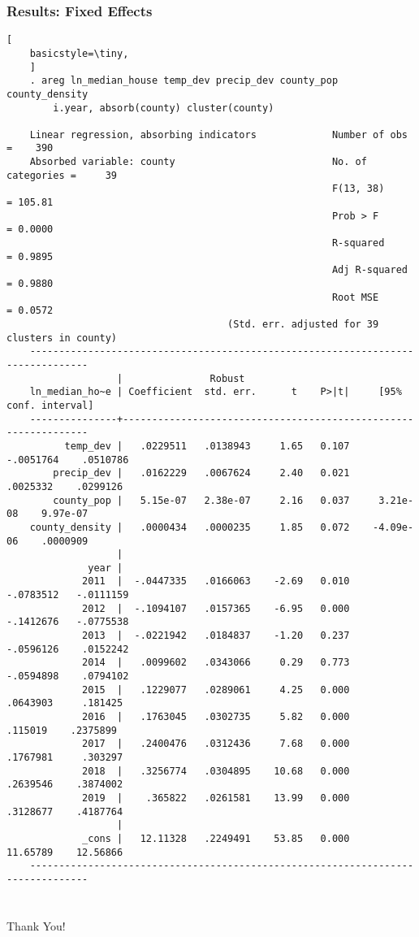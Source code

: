 \documentclass{beamer}
\begin{document}
\begin{frame}[fragile]
    \frametitle{Results: Fixed Effects}
    \begin{lstlisting}[
    basicstyle=\tiny,
    ]
    . areg ln_median_house temp_dev precip_dev county_pop county_density 
        i.year, absorb(county) cluster(county)

    Linear regression, absorbing indicators             Number of obs     =    390
    Absorbed variable: county                           No. of categories =     39
                                                        F(13, 38)         = 105.81
                                                        Prob > F          = 0.0000
                                                        R-squared         = 0.9895
                                                        Adj R-squared     = 0.9880
                                                        Root MSE          = 0.0572
                                      (Std. err. adjusted for 39 clusters in county)
    --------------------------------------------------------------------------------
                   |               Robust
    ln_median_ho~e | Coefficient  std. err.      t    P>|t|     [95% conf. interval]
    ---------------+----------------------------------------------------------------
          temp_dev |   .0229511   .0138943     1.65   0.107    -.0051764    .0510786
        precip_dev |   .0162229   .0067624     2.40   0.021     .0025332    .0299126
        county_pop |   5.15e-07   2.38e-07     2.16   0.037     3.21e-08    9.97e-07
    county_density |   .0000434   .0000235     1.85   0.072    -4.09e-06    .0000909
                   |
              year |
             2011  |  -.0447335   .0166063    -2.69   0.010    -.0783512   -.0111159
             2012  |  -.1094107   .0157365    -6.95   0.000    -.1412676   -.0775538
             2013  |  -.0221942   .0184837    -1.20   0.237    -.0596126    .0152242
             2014  |   .0099602   .0343066     0.29   0.773    -.0594898    .0794102
             2015  |   .1229077   .0289061     4.25   0.000     .0643903     .181425
             2016  |   .1763045   .0302735     5.82   0.000      .115019    .2375899
             2017  |   .2400476   .0312436     7.68   0.000     .1767981     .303297
             2018  |   .3256774   .0304895    10.68   0.000     .2639546    .3874002
             2019  |    .365822   .0261581    13.99   0.000     .3128677    .4187764
                   |
             _cons |   12.11328   .2249491    53.85   0.000     11.65789    12.56866
    --------------------------------------------------------------------------------
    
    \end{lstlisting}
    \end{frame}

\begin{frame}
    \frametitle{}
    \begin{center}
        Thank You!
    \end{center}
\end{frame}
\end{document}
